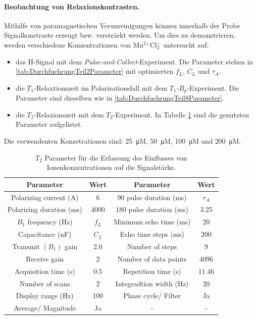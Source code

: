 \documentclass[../main.tex]{subfiles}
\begin{document}
    \paragraph{Beobachtung von Relaxionskontrasten.}
        Mithilfe von paramagnetischen Verunreinigungen können innerhalb der Probe Signalkonstraste erzeugt bzw. versträrkt werden. Um dies zu demonstrieren, werden verschiedene Konzentrationen von Mn$^\text{2+}$Cl$_\text{2}^{-}$ untersucht auf:
        \begin{itemize}
            \item das H-Signal mit dem \textit{Pulse-and-Collect}-Experiment. Die Parameter stehen in \ref{tab:DurchfuehrungTeil2Parameter} mit optimierten $f_L$, $C_L$ und $\tau_A$.
            \item die $T_1$-Relaxtionszeit im Polarisationsfall mit dem \textit{$T_1$-$B_p$}-Experiment. Die Parameter sind dieselben wie in \ref{tab:DurchfuehrungTeil8Parameter}.
            \item die $T_2$-Relaxionszeit mit dem $T_2$-Experiment. In Tabelle \ref{tab:DurchfuehrungTeil11ParameterT2} sind die genutzten Parameter aufgelistet.
        \end{itemize}
        Die verwendenten Konzetrationen sind: \SI{25}{\micro M}, \SI{50}{\micro M}, \SI{100}{\micro M} und \SI{200}{\micro M}.

        \begin{table}[H]
            \centering
            \begin{tabular}{cc|cc}
                \textbf{Parameter} & \textbf{Wert} & \textbf{Parameter} & \textbf{Wert}  \\\hline\hline
                Polarizing current (\si{\ampere}) & 6 & 90 pulse duration (\si{\milli\second}) & $\tau_A$ \\\hline
                Polarizing duration (\si{\milli\second}) & 4000 & 180 pulse duration (\si{\milli\second}) & 3.25 \\\hline
                $B_1$ frequency (\si{\hertz}) & $f_L$ & Minimum echo time (\si{\milli\second}) & 20 \\\hline
                Capacitance (\si{\nano\farad}) & $C_L$ & Echo time steps (\si{\milli\second}) & 200 \\\hline
                Transmit $(B_1)$ gain & \num{2.0} & Number of steps & 9 \\\hline
                Receive gain & 2 & Number of data points & 4096\\\hline
                Acquisition time (\si{\second}) & \num{0.5} & Repetition time (\si{\second}) & \num{11.46} \\\hline
                Number of scans & 2 & Integradtion width (\si{\hertz}) & 20 \\\hline
                Display range (\si{\hertz}) & 100 & Phase cycle/ Filter & Ja \\\hline
                Average/ Magnitude & Ja & - & - 
            \end{tabular}
            \caption{\textit{$T_2$} Parameter für die Erfassung des Einflusses von Ionenkonzentrationen auf die Signalstärke.}
            \label{tab:DurchfuehrungTeil11ParameterT2}
        \end{table}
\end{document}
